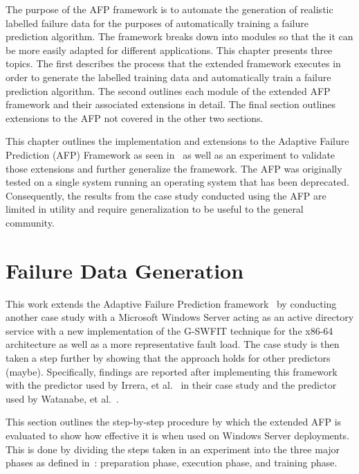 The purpose of the AFP framework is to automate the generation of realistic
labelled failure data for the purposes of automatically training a failure
prediction algorithm.  The framework breaks down into modules so that the it
can be more easily adapted for different applications.  This chapter presents
three topics.  The first describes the process that the extended framework
executes in order to generate the labelled training data and automatically
train a failure prediction algorithm.  The second outlines each module of the
extended AFP framework and their associated extensions in detail.  The final
section outlines extensions to the AFP not covered in the other two sections.

This chapter outlines the implementation and extensions to the Adaptive Failure
Prediction (AFP) Framework as seen in~\cite{irrera2015} as well as an
experiment to validate those extensions and further generalize the framework.
The AFP was originally tested on a single system running an operating system
that has been deprecated.  Consequently, the results from the case study
conducted using the AFP are limited in utility and require generalization to be
useful to the general community.

\section{Failure Data Generation} \label{sec:generation}
This work extends the Adaptive Failure Prediction framework~\cite{irrera2015}
by conducting another case study with a Microsoft Windows Server acting as an
active directory service with a new implementation of the G-SWFIT technique for
the x86-64 architecture as well as a more representative fault load.  The case
study is then taken a step further by showing that the approach holds for other
predictors (maybe).  Specifically, findings are reported after implementing
this framework with the predictor used by Irrera, et al.~\cite{irrera2015} in
their case study and the predictor used by Watanabe, et
al.~\cite{watanabe2014}.

This section outlines the step-by-step procedure by which the extended AFP is
evaluated to show how effective it is when used on Windows Server deployments.
This is done by dividing the steps taken in an experiment into the three major
phases as defined in~\cite{irrera2015}: preparation phase, execution phase, and
training phase.

